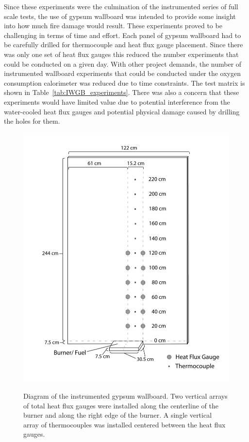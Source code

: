 \documentclass[twoside]{uocthesis}
\begin{document}
{Since these experiments were the culmination of the instrumented series of full scale tests, the use of gypsum wallboard was intended to provide some insight into how much fire damage would result. These experiments proved to be challenging in terms of time and effort.  Each panel of gypsum wallboard had to be carefully drilled for thermocouple and heat flux gauge placement. Since there was only one set of heat flux gauges this reduced the number experiments that could be conducted on a given day.  With other project demands, the number of instrumented wallboard experiments that could be conducted under the oxygen consumption calorimeter was reduced due to time constraints. The test matrix is shown in Table~\ref{tab:IWGB_experiments}. There was also a concern that these experiments would have limited value due to potential interference from the water-cooled heat flux gauges and potential physical damage caused by drilling the holes for them.

\begin{figure}
	\centering
	\includegraphics[width=\textwidth]{../Figures/Instrumented_GB_Wall}\\
	\caption[Diagram of the instrumented gypsum wallboard]{Diagram of the instrumented gypsum wallboard. Two vertical arrays of total heat flux gauges were installed along the centerline of the burner and along the right edge of the burner. A single vertical array of thermocouples was installed centered between the heat flux gauges.}
	\label{Instrumented_GB_Wall}
\end{figure}

}
\end{document}
